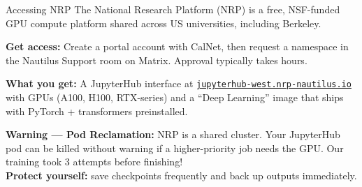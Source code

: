 \documentclass[aspectratio=169]{beamer}
\begin{document}
\begin{frame}{Accessing NRP}
    \hypertarget{nrp-access}{}
    The National Research Platform (NRP) is a free, NSF-funded GPU compute platform shared across US universities, including Berkeley.

    \vspace{0.5em}
    \textbf{Get access:} Create a portal account with CalNet, then request a namespace in the Nautilus Support room on Matrix. Approval typically takes hours.

    \vspace{0.5em}
    \textbf{What you get:} A JupyterHub interface at \href{https://jupyterhub-west.nrp-nautilus.io}{\texttt{jupyterhub-west.nrp-nautilus.io}} with GPUs (A100, H100, RTX-series) and a ``Deep Learning'' image that ships with PyTorch + transformers preinstalled.

    \vspace{0.5em}
    \begin{tcolorbox}[colback=red!5, colframe=red!40, boxrule=0.5pt, arc=2pt, fontupper=\small]
        \textbf{Warning --- Pod Reclamation:} NRP is a shared cluster. Your JupyterHub pod can be killed without warning if a higher-priority job needs the GPU. Our training took 3 attempts before finishing!\\[0.3em]
        \textbf{Protect yourself:} save checkpoints frequently and back up outputs immediately.
    \end{tcolorbox}

    \vspace{0.3em}
    \hfill\hyperlink{nrp-onboarding}{}
\end{frame}
\end{document}
